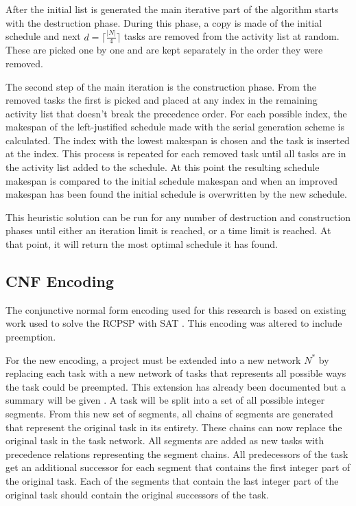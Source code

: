After the initial list is generated the main iterative part of the algorithm starts with the destruction phase. During this phase, a copy is made of the initial schedule and next \(d=\lceil\frac{|N|}{4}\rceil\)  tasks are removed from the activity list at random. These are picked one by one and are kept separately in the order they were removed.

The second step of the main iteration is the construction phase. From the removed tasks the first is picked and placed at any index in the remaining activity list that doesn't break the precedence order. For each possible index, the makespan of the left-justified schedule made with the serial generation scheme is calculated. The index with the lowest makespan is chosen and the task is inserted at the index. This process is repeated for each removed task until all tasks are in the activity list added to the schedule. At this point the resulting schedule makespan is compared to the initial schedule makespan and when an improved makespan has been found the initial schedule is overwritten by the new schedule.

This heuristic solution can be run for any number of destruction and construction phases until either an iteration limit is reached, or a time limit is reached. At that point, it will return the most optimal schedule it has found.


\subsection{CNF Encoding}
The conjunctive normal form encoding used for this research is based on existing work used to solve the RCPSP with SAT \cite{RN17}. This encoding was altered to include preemption.

For the new encoding, a project must be extended into a new network \(N^*\) by replacing each task with a new network of tasks that represents all possible ways the task could be preempted. This extension has already been documented but a summary will be given \cite{RN1}. A task will be split into a set of all possible integer segments. From this new set of segments, all chains of segments are generated that represent the original task in its entirety. These chains can now replace the original task in the task network. All segments are added as new tasks with precedence relations representing the segment chains. All predecessors of the task get an additional successor for each segment that contains the first integer part of the original task. Each of the segments that contain the last integer part of the original task should contain the original successors of the task.

